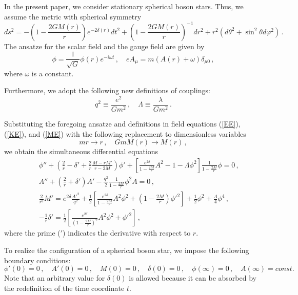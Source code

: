 \documentclass[
aps,prd,
12pt,%
nopreprintnumbers,
showpacs,
eqsecnum,
nofootinbib
]{revtex4-1}
\begin{document}
In the present paper, we consider stationary spherical boson stars. Thus, we assume
the metric with spherical symmetry
\begin{equation}
ds^2=-\left(1-\frac{2GM(r)}{r}\right)e^{-2\delta(r)}dt^2+
\left(1-\frac{2GM(r)}{r}\right)^{-1}dr^2+r^2(d\theta^2+\sin^2\theta d\varphi^2)\,.
\end{equation}
The ansatze for the scalar field and the gauge field are given by
\begin{equation}
\phi=\frac{1}{\sqrt{G}}\phi(r) e^{-i\omega t}\,,\quad
eA_\mu=m(A(r)+\omega)\delta_{\mu 0}\,,
\end{equation}
where $\omega$ is a constant.

Furthermore, we adopt the following new definitions of couplings:
\begin{equation}
q^2\equiv\frac{e^2}{Gm^2}\,,\quad
\Lambda\equiv\frac{\lambda}{Gm^2}\,.
\end{equation}

Substituting the foregoing ansatze and definitions in field equations (\ref{EE}),
(\ref{KE}), and (\ref{ME}) with the following replacement to
dimensionless variables
\begin{equation}
mr\rightarrow r\,,\quad GmM(r)\rightarrow M(r)\,,
\end{equation}
we obtain the simultaneous differential equations
\begin{eqnarray}
& &\phi''+\left(\frac{2}{r}-\delta'+\frac{2}{r}\frac{M-rM'}{r-2M}\right)\phi'+
\left[\frac{e^{2\delta}}{1-\frac{2M}{r}}A^2-1-\Lambda\phi^2
\right]\frac{1}{1-\frac{2M}{r}}\phi=0\,,\\
& &A''+\left(\frac{2}{r}+\delta'\right)A'-\frac{q^2}{2}
\frac{1}{1-\frac{2M}{r}}\phi^2A=0\,,\\
& &\frac{2}{r^2}M'=e^{2\delta}\frac{{A'}^2}{q^2}+\frac{1}{2}
\left[\frac{e^{2\delta}}{1-\frac{2M}{r}}A^2\phi^2+
\left(1-\frac{2M}{r}\right){\phi'}^2\right]
+\frac{1}{2}\phi^2+\frac{\Lambda}{4}\phi^4\,,\\
& &-\frac{1}{r}\delta'=\frac{1}{2}
\left[\frac{e^{2\delta}}{\left(1-\frac{2M}{r}\right)^2}A^2\phi^2+
\phi'^2\right]\,,
\end{eqnarray}
where the prime (${}'$) indicates the derivative with respect to $r$.

To realize the configuration of a spherical boson star, we impose the
following boundary conditions:
\begin{equation}
\phi'(0)=0\,, \quad A'(0)=0\,,\quad
M(0)=0\,,\quad\delta(0)=0\,,\quad \phi(\infty)=0\,,\quad A(\infty)=const.
\end{equation}
Note that an arbitrary value for $\delta(0)$ is allowed because it can be
absorbed by the redefinition of the time coordinate $t$.
\end{document}
